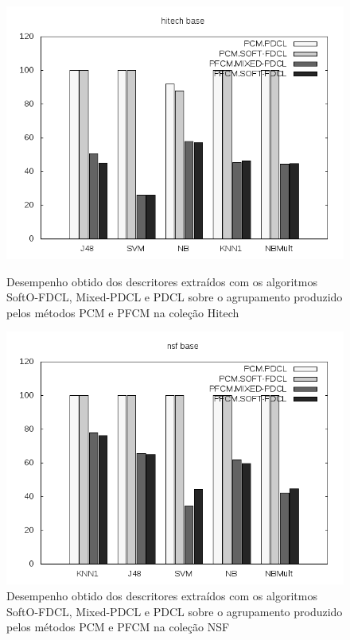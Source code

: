 \begin{figure}[!htp] \centering 
   \begin{minipage}{0.48\textwidth} 
     \centering
    \includegraphics[width=1.0\columnwidth]{assets/pdcl/hitech} 
    \caption{Desempenho obtido dos descritores extraídos com os algoritmos SoftO-FDCL, Mixed-PDCL e
    PDCL sobre o agrupamento produzido pelos métodos PCM e PFCM na coleção Hitech} 
  \label{fig:pfcmhitech}
  \end{minipage}\hfill 
  \begin{minipage}{0.48\textwidth} \centering
    \includegraphics[width=1.0\columnwidth]{assets/pdcl/nsf} 
    \caption{Desempenho obtido dos descritores extraídos com os algoritmos SoftO-FDCL, Mixed-PDCL e
    PDCL sobre o agrupamento produzido pelos métodos PCM e PFCM na coleção NSF} 
     \label{fig:pfcmnsf} 
   \end{minipage} 
\end{figure}


